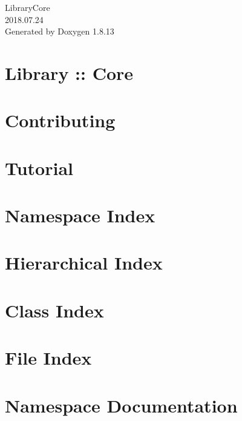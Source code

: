 \documentclass[twoside]{book}
\newcommand{\+}{\discretionary{\mbox{\scriptsize$\hookleftarrow$}}{}{}}
\newcommand{\clearemptydoublepage}{%
  \newpage{\pagestyle{empty}\cleardoublepage}%
}
\begin{document}
\hypersetup{pageanchor=false,
             bookmarksnumbered=true,
             pdfencoding=unicode
            }
\begin{titlepage}
\vspace*{7cm}
\begin{center}%
{\Large Library\+Core \\[1ex]\large 2018.\+07.\+24 }\\
\vspace*{1cm}
{\large Generated by Doxygen 1.8.13}\\
\end{center}
\end{titlepage}
\clearemptydoublepage
{}
\tableofcontents
\clearemptydoublepage
{}
\hypersetup{pageanchor=true}

\chapter{Library \+:\+: Core}
\label{index}\hypertarget{index}{}
\chapter{Contributing}
\label{md__c_o_n_t_r_i_b_u_t_i_n_g}

\chapter{Tutorial}
\label{md_docs__tutorial}

\chapter{Namespace Index}

\chapter{Hierarchical Index}

\chapter{Class Index}

\chapter{File Index}

\chapter{Namespace Documentation}












\end{document}
